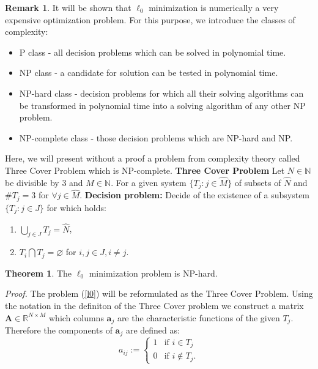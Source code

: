 \documentclass[11pt,oneside,czech,american]{book} %
\theoremstyle{definition} %
\newtheorem{thm}{Theorem}
\theoremstyle{definition}
\newtheorem{rmrk}{Remark}
\begin{document}
\begin{rmrk}
	It will be shown that $\ell_{0}$ minimization is numerically a very expensive optimization problem. For this purpose, we introduce the classes of complexity:
	
	\begin{itemize}
		\item P class - all decision problems which can be solved in polynomial time.
		\item NP class - a candidate for solution can be tested in polynomial time.
		\item NP-hard class - decision problems for which all their solving algorithms can be transformed in polynomial time  into a solving algorithm of any other NP problem.
		\item NP-complete class - those decision problems which are NP-hard and NP.
	\end{itemize}
	Here, we will present without a proof a problem from complexity theory called Three Cover Problem which is NP-complete.
	\newline
	\textbf{Three Cover Problem}
	\newline
	Let $N \in \mathbb{N}$ be divisible by 3 and $M \in \mathbb{N}$. For a given system $\{T_j: j \in \hat{M}\}$ of subsets of $\hat{N}$ and $\#T_j = 3$ for $\forall j \in \hat{M}$. \textbf{Decision problem:} Decide of the existence of a subsystem $\{T_j: j \in J\}$ for which holds:
	\begin{enumerate}
		\item $\bigcup_{j \in J} T_j = \hat{N}$,
		\item $T_i \bigcap T_j = \varnothing$ for $i,j \in J, i\neq j$.
	\end{enumerate}
	
\end{rmrk}
\begin{thm}
	The $\ell_{0}$ minimization problem is NP-hard.
\end{thm}
\emph{Proof.} The problem (\ref{l0}) will be reformulated as the Three Cover Problem. Using the notation in the definiton of the Three Cover problem we construct a matrix $\bm{A} \in \mathbb{R}^{N \times M}$ which columns $\bm{a}_j$ are the characteristic functions of the given $T_j$. Therefore the components of $\bm{a}_j$ are defined as:
\begin{equation*}
	a_{ij} := \begin{cases}
		1 &\text{if $i \in T_j$}\\
		0 &\text{if $i \notin T_j$}.
	\end{cases}
\end{equation*}
\end{document}
